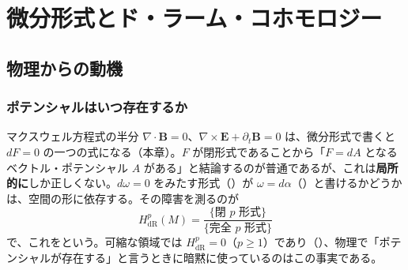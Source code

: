 \chapter{微分形式とド・ラーム・コホモロジー}\label{ch:05}

\section{物理からの動機}

\subsection*{ポテンシャルはいつ存在するか}
マクスウェル方程式の半分 $\nabla\cdot\bm B=0$、$\nabla\times\bm E+\partial_t\bm B=0$ は、微分形式で書くと $dF=0$ の一つの式になる（本章）。$F$ が閉形式であることから「$F=dA$ となるベクトル・ポテンシャル $A$ がある」と結論するのが普通であるが、これは\textbf{局所的に}しか正しくない。$d\omega=0$ をみたす形式（）が $\omega=d\alpha$（）と書けるかどうかは、空間の形に依存する。その障害を測るのが
\[
H^p_{\mathrm{dR}}(M)=\frac{\{\text{閉 $p$ 形式}\}}{\{\text{完全 $p$ 形式}\}}
\]
で、これをという。可縮な領域では $H^p_{\mathrm{dR}}=0$（$p\ge1$）であり（）、物理で「ポテンシャルが存在する」と言うときに暗黙に使っているのはこの事実である。

